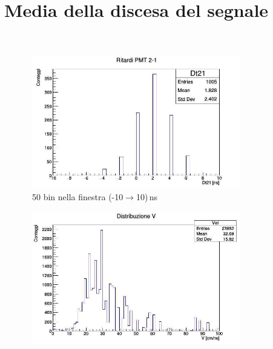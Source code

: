\documentclass[a4paper,twocolumn]{article}
\begin{document}
\begin{figure}[H]
     \centering
     \title{Media della discesa del segnale}
     \begin{center}
     \begin{subfigure}[b]{0.4\textwidth}
         \centering
         \includegraphics[width=\textwidth]{./immagini/TimeOfFlight/Rit21MidNegSlo.jpg}
         \caption{50 bin nella finestra (-10$\rightarrow$10)\,ns}
         \label{fig:Dt21MidNegSlo}
     \end{subfigure}
     \hfill
     \begin{subfigure}[b]{0.4\textwidth}
         \centering
         \includegraphics[width=\textwidth]{./immagini/TimeOfFlight/VMidNegSlo.jpg}
         \caption{}
         \label{fig:VMidNegSlo}
     \end{subfigure}
     \end{center}
     \caption{}        
     \label{fig:MidNegSlo}
\end{figure}
\end{document}
